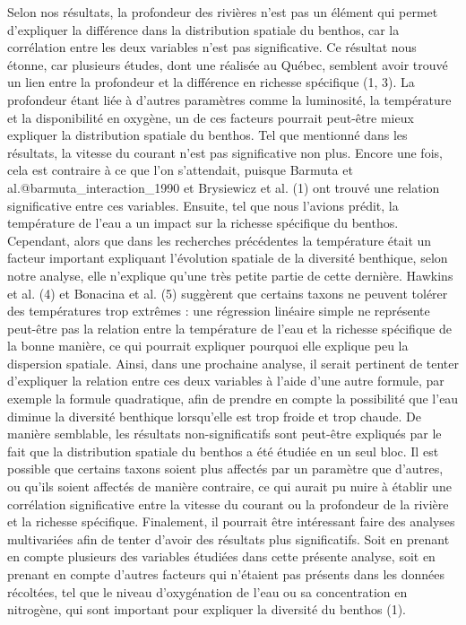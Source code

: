 \documentclass[9pt,twocolumn,twoside,final]{pnas-new}
\begin{document}
Selon nos résultats, la profondeur des rivières n'est pas un élément qui
permet d'expliquer la différence dans la distribution spatiale du
benthos, car la corrélation entre les deux variables n'est pas
significative. Ce résultat nous étonne, car plusieurs études, dont une
réalisée au Québec, semblent avoir trouvé un lien entre la profondeur et
la différence en richesse spécifique (1, 3). La profondeur étant liée à
d'autres paramètres comme la luminosité, la température et la
disponibilité en oxygène, un de ces facteurs pourrait peut-être mieux
expliquer la distribution spatiale du benthos. Tel que mentionné dans
les résultats, la vitesse du courant n'est pas significative non plus.
Encore une fois, cela est contraire à ce que l'on s'attendait, puisque
Barmuta et al.@barmuta\_interaction\_1990 et Brysiewicz et al. (1) ont
trouvé une relation significative entre ces variables. Ensuite, tel que
nous l'avions prédit, la température de l'eau a un impact sur la
richesse spécifique du benthos. Cependant, alors que dans les recherches
précédentes la température était un facteur important expliquant
l'évolution spatiale de la diversité benthique, selon notre analyse,
elle n'explique qu'une très petite partie de cette dernière. Hawkins et
al. (4) et Bonacina et al. (5) suggèrent que certains taxons ne peuvent
tolérer des températures trop extrêmes : une régression linéaire simple
ne représente peut-être pas la relation entre la température de l'eau et
la richesse spécifique de la bonne manière, ce qui pourrait expliquer
pourquoi elle explique peu la dispersion spatiale. Ainsi, dans une
prochaine analyse, il serait pertinent de tenter d'expliquer la relation
entre ces deux variables à l'aide d'une autre formule, par exemple la
formule quadratique, afin de prendre en compte la possibilité que l'eau
diminue la diversité benthique lorsqu'elle est trop froide et trop
chaude. De manière semblable, les résultats non-significatifs sont
peut-être expliqués par le fait que la distribution spatiale du benthos
a été étudiée en un seul bloc. Il est possible que certains taxons
soient plus affectés par un paramètre que d'autres, ou qu'ils soient
affectés de manière contraire, ce qui aurait pu nuire à établir une
corrélation significative entre la vitesse du courant ou la profondeur
de la rivière et la richesse spécifique. Finalement, il pourrait être
intéressant faire des analyses multivariées afin de tenter d'avoir des
résultats plus significatifs. Soit en prenant en compte plusieurs des
variables étudiées dans cette présente analyse, soit en prenant en
compte d'autres facteurs qui n'étaient pas présents dans les données
récoltées, tel que le niveau d'oxygénation de l'eau ou sa concentration
en nitrogène, qui sont important pour expliquer la diversité du benthos
(1).
\end{document}
